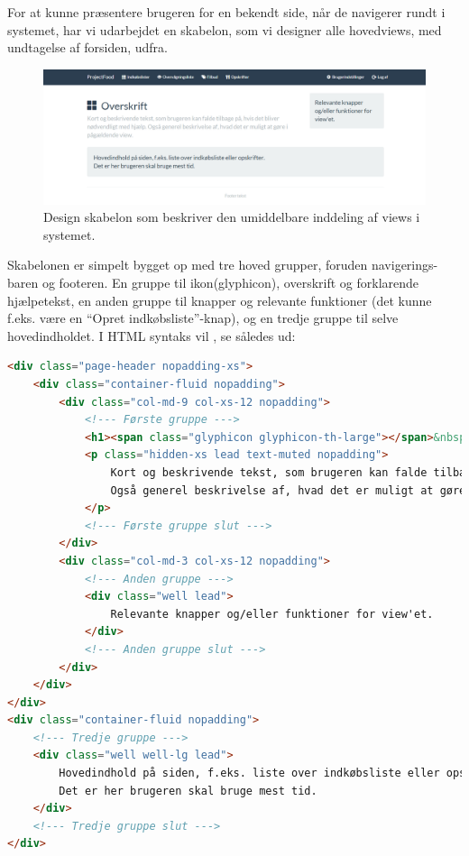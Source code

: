 For at kunne præsentere brugeren for en bekendt side, når de navigerer rundt i systemet, har vi udarbejdet en skabelon, som vi designer alle hovedviews, med undtagelse af forsiden, udfra.
\begin{figure}[h]
\includegraphics[trim=3.5cm 0cm 3cm 0cm, clip=true, width=1\textwidth]{images/Images/generelt_layout.png}
\caption{Design skabelon som beskriver den umiddelbare inddeling af views i systemet.}\label{ss:design_skabelon}
\end{figure}
Skabelonen er simpelt bygget op med tre hoved grupper, foruden navigerings-baren og footeren. En gruppe til ikon(glyphicon), overskrift og forklarende hjælpetekst, en anden gruppe til knapper og relevante funktioner (det kunne f.eks. være en ``Opret indkøbsliste''-knap), og en tredje gruppe til selve hovedindholdet.
I HTML syntaks vil , se således ud:
\begin{lstlisting}[language=HTML, caption=HTML-kode med de tre hoved grupper, label=html:design_skabelon]
<div class="page-header nopadding-xs">
    <div class="container-fluid nopadding">
        <div class="col-md-9 col-xs-12 nopadding">
            <!--- Første gruppe --->
            <h1><span class="glyphicon glyphicon-th-large"></span>&nbsp;&nbsp;Overskrift</h1>
            <p class="hidden-xs lead text-muted nopadding">
                Kort og beskrivende tekst, som brugeren kan falde tilbage på, hvis det bliver nødvendligt med hjælp.
                Også generel beskrivelse af, hvad det er muligt at gøre i pågældende view.
            </p>
            <!--- Første gruppe slut --->
        </div>
        <div class="col-md-3 col-xs-12 nopadding">
            <!--- Anden gruppe --->            
            <div class="well lead">
                Relevante knapper og/eller funktioner for view'et.
            </div>
            <!--- Anden gruppe slut --->
        </div>
    </div>
</div>
<div class="container-fluid nopadding">
    <!--- Tredje gruppe --->
    <div class="well well-lg lead">
        Hovedindhold på siden, f.eks. liste over indkøbsliste eller opskrifter.<br />
        Det er her brugeren skal bruge mest tid.
    </div>
    <!--- Tredje gruppe slut --->
</div>
\end{lstlisting}

